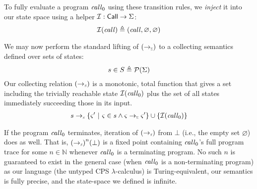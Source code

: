 To fully evaluate a program $\mathit{call}_0$ using these transition rules, we \textit{inject} it into our state space using a helper 
$\mathcal{I} : \mathsf{Call} \to \Sigma$:
%
\begin{align*}
  \mathcal{I}(\mathit{call}) \triangleq (\mathit{call}, \varnothing, \varnothing)
\end{align*}


We may now perform the standard lifting of $(\cTo)$ to a collecting semantics defined over sets of states:
%
\begin{align*}
  s \in S \triangleq \mathcal{P}(\Sigma)
\end{align*}
%
Our collecting relation $(\cToW)$ is a monotonic, total function that gives a set including the trivially reachable state $\mathcal{I}(\mathit{call}_0)$
plus the set of all states immediately succeeding those in its input.
%
\begin{align*}
  s \cToW \Set{ \varsigma'\ \vert\ \varsigma \in s \wedge \varsigma \cTo \varsigma' } \cup \Set{ \mathcal{I}(\var{call}_0) }
\end{align*}


If the program $\mathit{call}_0$ terminates, iteration of $(\cToW)$ from $\bot$ (i.e., the empty set $\varnothing$) does as well.
%
That is, ${(\cToW)}^{n}(\bot)$ is a fixed point containing $\mathit{call}_0$'s full program trace for some $n \in \mathbb{N}$ whenever $\mathit{call}_0$ is a terminating program.
%
No such $n$ is guaranteed to exist in the general case (when $\mathit{call}_0$ is a non-terminating program)
as our language (the untyped CPS $\lambda$-calculus) is Turing-equivalent, our semantics is fully precise, and the state-space we defined is infinite.


